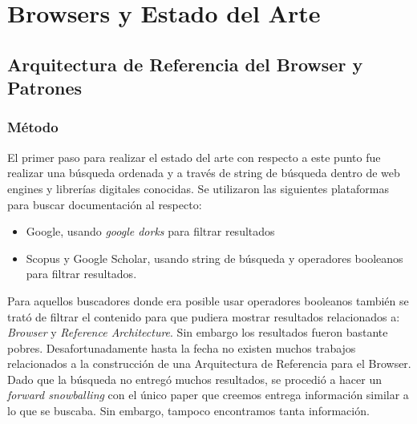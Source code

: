 \chapter{Browsers y Estado del Arte}
\label{chap4:EA}


\section{Arquitectura de Referencia del Browser y Patrones}
\label{chap3:ArqRefBrowandPatt}


\subsection{Método}
El primer paso para realizar el estado del arte con respecto a este punto fue realizar una búsqueda ordenada y a través de string de búsqueda dentro de web engines y librerías digitales conocidas. Se utilizaron las siguientes plataformas para buscar documentación al respecto:
\begin{itemize}
    \item Google, usando \textit{google dorks} para filtrar resultados
    \item Scopus y Google Scholar, usando string de búsqueda y operadores booleanos para filtrar resultados.
\end{itemize}

Para aquellos buscadores donde era posible usar operadores booleanos también se trató de filtrar el contenido para que pudiera mostrar resultados relacionados a: \textit{Browser} y \textit{Reference Architecture}. Sin embargo los resultados fueron bastante pobres. Desafortunadamente hasta la fecha no existen muchos trabajos relacionados a la construcción de una Arquitectura de Referencia para el Browser. Dado que la búsqueda no entregó muchos resultados, se procedió a hacer un \textit{forward snowballing} con el único paper que creemos entrega información similar a lo que se buscaba. Sin embargo, tampoco encontramos tanta información.

